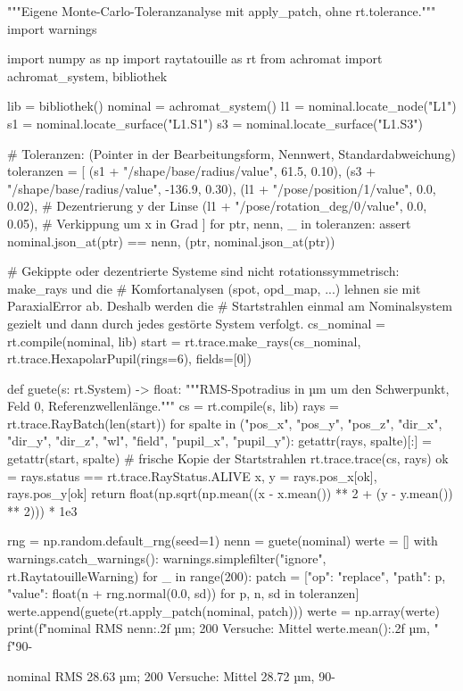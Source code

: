 \documentclass[11pt,a4paper,openany]{book}
\DeclareRobustCommand{\code}[1]{\texttt{\directlua{rttcode("\luaescapestring{\detokenize{#1}}")}}}
\begin{document}
\begin{pycode}[title={\code{ex19_monte_carlo.py}}]
"""Eigene Monte-Carlo-Toleranzanalyse mit apply_patch, ohne rt.tolerance."""
import warnings

import numpy as np
import raytatouille as rt
from achromat import achromat_system, bibliothek

lib = bibliothek()
nominal = achromat_system()
l1 = nominal.locate_node("L1")
s1 = nominal.locate_surface("L1.S1")
s3 = nominal.locate_surface("L1.S3")

# Toleranzen: (Pointer in der Bearbeitungsform, Nennwert, Standardabweichung)
toleranzen = [
    (s1 + "/shape/base/radius/value", 61.5, 0.10),
    (s3 + "/shape/base/radius/value", -136.9, 0.30),
    (l1 + "/pose/position/1/value", 0.0, 0.02),      # Dezentrierung y der Linse
    (l1 + "/pose/rotation_deg/0/value", 0.0, 0.05),  # Verkippung um x in Grad
]
for ptr, nenn, _ in toleranzen:
    assert nominal.json_at(ptr) == nenn, (ptr, nominal.json_at(ptr))


# Gekippte oder dezentrierte Systeme sind nicht rotationssymmetrisch: make_rays und die
# Komfortanalysen (spot, opd_map, ...) lehnen sie mit ParaxialError ab. Deshalb werden die
# Startstrahlen einmal am Nominalsystem gezielt und dann durch jedes gestörte System verfolgt.
cs_nominal = rt.compile(nominal, lib)
start = rt.trace.make_rays(cs_nominal, rt.trace.HexapolarPupil(rings=6), fields=[0])


def guete(s: rt.System) -> float:
    """RMS-Spotradius in µm um den Schwerpunkt, Feld 0, Referenzwellenlänge."""
    cs = rt.compile(s, lib)
    rays = rt.trace.RayBatch(len(start))
    for spalte in ("pos_x", "pos_y", "pos_z", "dir_x", "dir_y", "dir_z", "wl", "field",
                   "pupil_x", "pupil_y"):
        getattr(rays, spalte)[:] = getattr(start, spalte)   # frische Kopie der Startstrahlen
    rt.trace.trace(cs, rays)
    ok = rays.status == rt.trace.RayStatus.ALIVE
    x, y = rays.pos_x[ok], rays.pos_y[ok]
    return float(np.sqrt(np.mean((x - x.mean()) ** 2 + (y - y.mean()) ** 2))) * 1e3


rng = np.random.default_rng(seed=1)
nenn = guete(nominal)
werte = []
with warnings.catch_warnings():
    warnings.simplefilter("ignore", rt.RaytatouilleWarning)
    for _ in range(200):
        patch = [{"op": "replace", "path": p, "value": float(n + rng.normal(0.0, sd))}
                 for p, n, sd in toleranzen]
        werte.append(guete(rt.apply_patch(nominal, patch)))
werte = np.array(werte)
print(f"nominal RMS {nenn:.2f} µm; 200 Versuche: Mittel {werte.mean():.2f} µm, "
      f"90-%
\end{pycode}
\begin{ausgabe}
nominal RMS 28.63 µm; 200 Versuche: Mittel 28.72 µm, 90-%
\end{ausgabe}
\end{document}
